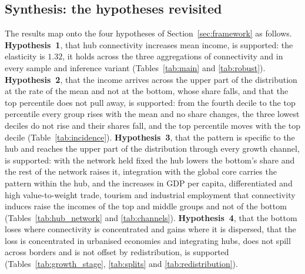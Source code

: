 \subsection{Synthesis: the hypotheses revisited}
\label{sec:synthesis}
The results map onto the four hypotheses of Section~\ref{sec:framework} as follows. \textbf{Hypothesis~1}, that hub connectivity increases mean income, is supported: the elasticity is $1.32$, it holds across the three aggregations of connectivity and in every sample and inference variant (Tables~\ref{tab:main} and \ref{tab:robust}). \textbf{Hypothesis~2}, that the income arrives across the upper part of the distribution at the rate of the mean and not at the bottom, whose share falls, and that the top percentile does not pull away, is supported: from the fourth decile to the top percentile every group rises with the mean and no share changes, the three lowest deciles do not rise and their shares fall, and the top percentile moves with the top decile (Table~\ref{tab:incidence}). \textbf{Hypothesis~3}, that the pattern is specific to the hub and reaches the upper part of the distribution through every growth channel, is supported: with the network held fixed the hub lowers the bottom's share and the rest of the network raises it, integration with the global core carries the pattern within the hub, and the increases in GDP per capita, differentiated and high value-to-weight trade, tourism and industrial employment that connectivity induces raise the incomes of the top and middle groups and not of the bottom (Tables~\ref{tab:hub_network} and \ref{tab:channels}). \textbf{Hypothesis~4}, that the bottom loses where connectivity is concentrated and gains where it is dispersed, that the loss is concentrated in urbanised economies and integrating hubs, does not spill across borders and is not offset by redistribution, is supported (Tables~\ref{tab:growth_stage}, \ref{tab:splits} and \ref{tab:redistribution}).

